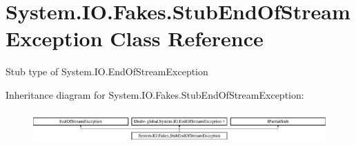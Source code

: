 \hypertarget{class_system_1_1_i_o_1_1_fakes_1_1_stub_end_of_stream_exception}{\section{System.\-I\-O.\-Fakes.\-Stub\-End\-Of\-Stream\-Exception Class Reference}
\label{class_system_1_1_i_o_1_1_fakes_1_1_stub_end_of_stream_exception}
}


Stub type of System.\-I\-O.\-End\-Of\-Stream\-Exception 


Inheritance diagram for System.\-I\-O.\-Fakes.\-Stub\-End\-Of\-Stream\-Exception\-:\begin{figure}[H]
\begin{center}
\leavevmode
\includegraphics[height=1.240310cm]{class_system_1_1_i_o_1_1_fakes_1_1_stub_end_of_stream_exception}
\end{center}
\end{figure}
